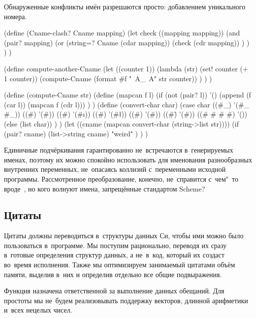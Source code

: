 Обнаруженные конфликты имён разрешаются просто: добавлением уникального номера.


\begin{code:lisp}
(define (Cname-clash? Cname mapping)
  (let check ((mapping mapping))
    (and (pair? mapping)
         (or (string=? Cname (cdar mapping))
             (check (cdr mapping)) ) ) ) )

(define compute-another-Cname
  (let ((counter 1))
    (lambda (str)
      (set! counter (+ 1 counter))
      (compute-Cname (format #f "~A_~A" str counter)) ) ) )

(define (compute-Cname str)
  (define (mapcan f l)
    (if (not (pair? l)) '()
        (append (f (car l)) (mapcan f (cdr l))) ) )
  (define (convert-char char)
    (case char
      ((#\_)             '(#\_ #\_))
      ((#\?)             '(#\p))
      ((#\!)             '(#\i))
      ((#\<)             '(#\l))
      ((#\>)             '(#\g))
      ((#\=)             '(#\e))
      ((#\- #\/ #\* #\:) '())
      (else              (list char)) ) )
  (let ((cname (mapcan convert-char (string->list str))))
    (if (pair? cname)
        (list->string cname)
        "weird" ) ) )
\end{code:lisp}


Единичные подчёркивания гарантированно не~встречаются в~генерируемых именах,
поэтому их можно спокойно использовать для именования разнообразных внутренних
переменных, не~опасаясь коллизий с~переменными исходной программы. Рассмотренное
преобразование, конечно, не~справится с~чем"~то вроде~, но кого волнуют
имена, запрещённые стандартом Scheme?


\subsection{Цитаты}\label{cc/gen/ssect:quote}

Цитаты должны переводиться в~структуры данных Си, чтобы ими можно было
пользоваться в~программе. Мы поступим рационально, переводя их сразу в~готовые
определения структур данных, а не~в~код, который их создаст во~время исполнения.
Также мы оптимизируем занимаемый цитатами объём памяти, выделив в~них и
определив отдельно все общие подвыражения.

Функция  назначена ответственной за выполнение данных
обещаний. Для простоты мы не~будем реализовывать поддержку векторов, длинной
арифметики и~всех нецелых чисел.

